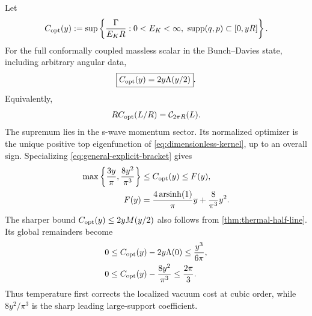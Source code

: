 \begin{theorem}
\label{thm:main}
Let
\begin{equation}
 C_{\rm opt}(y)
 :=\sup\left\{\frac{\Gamma}{E_{K} R}:
 0<E_{K}<\infty,\ \operatorname{supp}(q,p)\subset[0,yR]\right\}.
 \label{eq:copt-definition}
\end{equation}
For the full conformally coupled massless scalar in the Bunch--Davies state,
including arbitrary angular data,
\begin{equation}
 \boxed{C_{\rm opt}(y)=2y\Lambda(y/2)}.
 \label{eq:sharp-cost}
\end{equation}
Equivalently,
\begin{equation}
 R C_{\rm opt}(L/R)=\mathcal C_{2\pi R}(L).
 \label{eq:de-sitter-specialization}
\end{equation}
The supremum lies in the s-wave momentum sector.  Its normalized optimizer is
the unique positive top eigenfunction of \cref{eq:dimensionless-kernel}, up to
an overall sign.  Specializing \cref{eq:general-explicit-bracket} gives
\begin{align}
 \max\left\{\frac{3y}{\pi},\frac{8y^2}{\pi^3}\right\}
 &\leq C_{\rm opt}(y)
 \leq F(y),
 \label{eq:global-explicit-bracket}\\
 F(y)&=\frac{4\operatorname{arsinh}(1)}\pi y
 +\frac8{\pi^3}y^2.
 \label{eq:de-sitter-bound}
\end{align}
The sharper bound $C_{\rm opt}(y)\leq2yM(y/2)$ also follows from
\cref{thm:thermal-half-line}.  Its global remainders become
\begin{align}
 0&\leq C_{\rm opt}(y)-2y\Lambda(0)
 \leq\frac{y^3}{6\pi},
 \label{eq:small-support-exact}\\
 0&\leq C_{\rm opt}(y)-\frac{8y^2}{\pi^3}
 \leq\frac{2\pi}{3}.
 \label{eq:large-support-exact}
\end{align}
Thus temperature first corrects the localized vacuum cost at cubic order,
while $8y^2/\pi^3$ is the sharp leading large-support coefficient.
\end{theorem}


